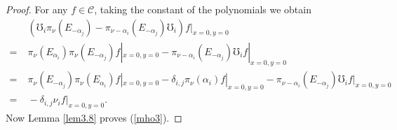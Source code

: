 \documentclass[12pt]{article}
\numberwithin{equation}{section}
\theoremstyle{definition}
\theoremstyle{remark}
\begin{document}
\begin{proof}
	For any $f\in\mathscr{C}$, taking the constant of the polynomials we obtain
	\begin{align}
		&\;(\mho_i\pi_{\nu}(E_{-\alpha_j})-\pi_{\nu-\alpha_i}(E_{-\alpha_j})\mho_i)f|_{x=0,y=0}\nonumber\\
		=&\;\pi_\nu(E_{\alpha_i})\pi_{\nu}(E_{-\alpha_j})f|_{x=0,y=0}-\pi_{\nu-\alpha_i}(E_{-\alpha_j})\mho_if|_{x=0,y=0}\nonumber\\
		=&\;\pi_\nu(E_{-\alpha_j})\pi_\nu(E_{\alpha_i})f|_{x=0,y=0}-\delta_{i,j}\pi_{\nu}(\alpha_i)f|_{x=0,y=0}-\pi_{\nu-\alpha_i}(E_{-\alpha_j})\mho_if|_{x=0,y=0}\nonumber\\
		=&\;-\delta_{i,j}\nu_if|_{x=0,y=0}.
	\end{align}
	Now Lemma \ref{lem3.8} proves (\ref{mho3}).
\end{proof}
\end{document}
